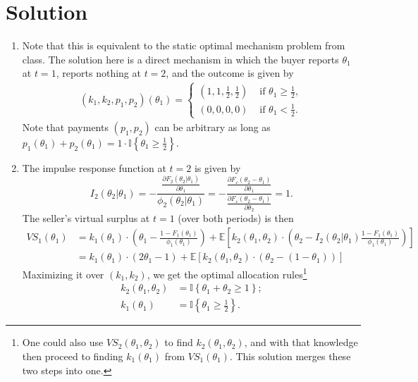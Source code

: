 \documentclass[a4paper]{article}
\begin{document}
\section*{Solution}
	\begin{enumerate}
		\item Note that this is equivalent to the static optimal mechanism problem from class. The solution here is a direct mechanism in which the buyer reports $\theta_1$ at $t=1$, reports nothing at $t=2$, and the outcome is given by
		\begin{align*}
			(k_1,k_2,p_1,p_2)(\theta_1) =
			\begin{cases}
				\left( 1,1, \frac{1}{2}, \frac{1}{2} \right) & \text{ if } \theta_1 \geq \frac{1}{2},
				\\
				\left( 0,0,0,0 \right) & \text{ if } \theta_1 < \frac{1}{2}.
			\end{cases}
		\end{align*}
		Note that payments $(p_1,p_2)$ can be arbitrary as long as $p_1(\theta_1) + p_2(\theta_1) = 1 \cdot \mathbb{I} \left\{ \theta_1 \geq \frac{1}{2} \right\}$.
		
		\item The impulse response function at $t=2$ is given by
		\begin{equation*}
			I_2(\theta_2 | \theta_1) = -\frac{\frac{\partial F_2(\theta_2 | \theta_1)}{\partial \theta_1}}{\phi_2(\theta_2 | \theta_1)} = -\frac{\frac{\partial F_\varepsilon(\theta_2 - \theta_1)}{\partial \theta_1}}{\frac{\partial F_\varepsilon(\theta_2 - \theta_1)}{\partial \theta_2}} = 1.
		\end{equation*}
		The seller's virtual surplus at $t=1$ (over both periods) is then
		\begin{align*}
			VS_1 (\theta_1) &= k_1(\theta_1) \cdot \left( \theta_1 - \frac{1-F_1(\theta_1)}{\phi_1(\theta_1)} \right) + \mathbb{E} \left[ k_2(\theta_1,\theta_2) \cdot \left( \theta_2 - I_2(\theta_2 | \theta_1) \frac{1-F_1(\theta_1)}{\phi_1(\theta_1)} \right) \right]
			\\
			&= k_1(\theta_1) \cdot \left( 2 \theta_1 - 1 \right) + \mathbb{E} \left[ k_2(\theta_1,\theta_2) \cdot \left( \theta_2 - (1 - \theta_1) \right) \right]
		\end{align*}
		Maximizing it over $(k_1,k_2)$, we get the optimal allocation rules\footnote{One could also use $VS_2(\theta_1,\theta_2)$ to find $k_2(\theta_1,\theta_2)$, and with that knowledge then proceed to finding $k_1(\theta_1)$ from $VS_1(\theta_1)$. This solution merges these two steps into one.}
		\begin{align*}
			k_2 (\theta_1,\theta_2) &= \mathbb{I} \left\{ \theta_1 + \theta_2 \geq 1 \right\};
			\\
			k_1 (\theta_1) &= \mathbb{I} \left\{ \theta_1 \geq \frac{1}{2} \right\}.
		\end{align*}
		

\end{enumerate}
\end{document}
